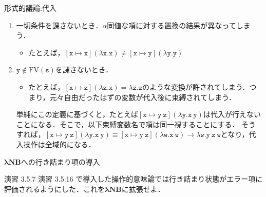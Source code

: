 \documentclass[9pt]{beamer}
\begin{document}
\begin{frame}{形式的議論:代入}
\begin{enumerate}
\item 一切条件を課さないとき．$\alpha$同値な項に対する置換の結果が異なってしまう．\begin{itemize}\item たとえば，$\mathtt{\left[x\mapsto x\right](\lambda x. x)\neq \left[x\mapsto y\right](\lambda y. y)}$\end{itemize}
\item $\mathtt{y\notin \mathrm{FV}(s)}$を課さないとき．\begin{itemize}
	\item たとえば，$\mathtt{\left[x\mapsto z\right](\lambda z. x) = \lambda z. z}$のような変換が許されてしまう．つまり，元々自由だったはずの変数が代入後に束縛されてしまう．
\end{itemize}
単純にこの定義に基づくと，たとえば$\mathtt{\left[x\mapsto y\ z\right](\lambda y. x\ y)}$は代入が行えないことになる．そこで，以下束縛変数名で項は同一視することにする．
そうすれば，$\mathtt{\left[x\mapsto y\ z\right](\lambda y. x\ y)\equiv\left[x\mapsto y\ z\right](\lambda w. x\ w)\to \lambda w. y\ z\ w}$となり，代入操作は全域的になる．
\end{enumerate}
\end{frame}
\begin{frame}{$\mathbf{\lambda NB}$への行き詰まり項の導入}
	\begin{tblock}{演習 3.5.7}
		演習 3.5.16 で導入した操作的意味論では行き詰まり状態がエラー項に評価されるようにした．これを$\mathbf{\lambda NB}$に拡張せよ．
	\end{tblock}

\end{frame}
\end{document}
